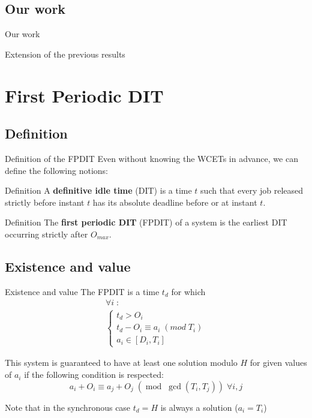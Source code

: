 \documentclass{beamer}
\begin{document}
	\subsection{Our work}

	\begin{frame}{Our work}

	Extension of the previous results

	\end{frame}

\section{First Periodic DIT}

	\subsection{Definition}

	\begin{frame}{Definition of the FPDIT}
		Even without knowing the WCETs in advance, we can define the following notions:
		\begin{block}{Definition}
			A \textbf{definitive idle time} (DIT) \cite{lipariaverage} is a time $t$ such that every job
			released strictly before instant $t$ has its absolute deadline before or at instant $t$.
		\end{block}
		\begin{block}{Definition}
			The \textbf{first periodic DIT} (FPDIT) of a system is the earliest DIT occurring
			strictly after $O_{max}$.
		\end{block}

	\end{frame}

	\subsection{Existence and value}

	\begin{frame}{Existence and value}
		The FPDIT is a time $t_d$ for which
		\[
			\begin{array}{l}
				\forall i \; :\\
				\left\{
					\begin{array}{l}
						t_d > O_i \\
						t_d - O_i \equiv a_i \; (mod \; T_i) \\
						a_i \in [D_i, T_i]
					\end{array}
				\right.
			\end{array}
		\]

		This system is guaranteed to have at least one solution modulo $H$ for given
		values of $a_i$ if the following condition is respected:
		\[
			a_i + O_i \equiv a_j + O_j \; (\operatorname{mod} \; \operatorname{gcd}(T_i,
			T_j)) \; \forall i,j
		\]

		Note that in the synchronous case $t_d = H$ is always a solution ($a_i = T_i$)
	\end{frame}
\end{document}
